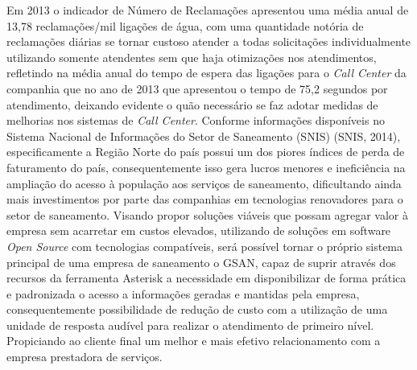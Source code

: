  Em 2013 o indicador de Número de Reclamações apresentou uma média anual de 13,78 reclamações/mil ligações de água, com uma quantidade notória de reclamações diárias se tornar custoso atender a todas solicitações individualmente utilizando somente atendentes sem que haja otimizações nos atendimentos, refletindo na média anual do tempo de espera das ligações para o \textit{Call Center} da companhia que no ano de 2013 que apresentou o tempo de 75,2 segundos por atendimento, deixando evidente o quão necessário se faz adotar medidas de melhorias nos sistemas de \textit{Call Center}. Conforme informações disponíveis no Sistema Nacional de Informações do Setor de Saneamento (SNIS) (SNIS, 2014), especificamente a Região Norte do país possui um dos piores índices de perda de faturamento do país, consequentemente isso gera lucros menores e ineficiência na ampliação do acesso à população aos serviços de saneamento, dificultando ainda mais investimentos por parte das companhias em tecnologias renovadores para o setor de saneamento. Visando propor soluções viáveis que possam agregar valor à empresa sem acarretar em custos elevados, utilizando de soluções em software \textit{Open Source} com tecnologias compatíveis, será possível tornar o próprio sistema principal de uma empresa de saneamento o GSAN, capaz de suprir através dos recursos da ferramenta Asterisk a necessidade em disponibilizar de forma prática e padronizada o acesso a informações geradas e mantidas pela empresa, consequentemente possibilidade de redução de custo com a utilização de uma unidade de resposta audível para realizar o atendimento de primeiro nível. Propiciando ao cliente final um melhor e mais efetivo relacionamento com a empresa prestadora de serviços.

